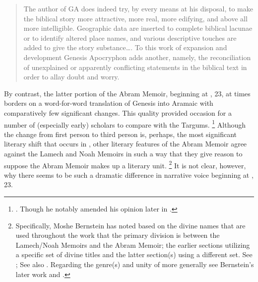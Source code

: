 \begin{quote}
    The author of GA does indeed try, by every means at his disposal, to make the biblical story more attractive, more real, more edifying, and above all more intelligible. Geographic data are inserted to complete biblical lacunae or to identify altered  place names, and various descriptive touches are added to give the story substance\dots. To this work of expansion and development Genesis Apocryphon adds another, namely, the reconciliation of unexplained or apparently conflicting statements in the biblical text in order to allay doubt and worry.\autocite[125]{vermes1961}
\end{quote}
\noindent
By contrast, the latter portion of the Abram Memoir, beginning at , 23, at times borders on a word-for-word translation of Genesis into Aramaic with comparatively few significant changes. This quality provided occasion for a number of (especially early) scholars to compare \ga with the Targums.%
    \footnote{\Cite[193]{black1983}. Though he notably amended his opinion later in \cite*{black_black-fohrer1968}.}
Although the change from first person to third person is, perhaps, the most significant literary shift that occurs in \ga, other literary features of the Abram Memoir agree against the Lamech and Noah Memoirs in such a way that they give reason to suppose the Abram Memoir makes up a literary unit.%
    \footnote{Specifically, Moshe Bernstein has noted based on the divine names that are used throughout the work that the primary division is between the Lamech/Noah Memoirs and the Abram Memoir; the earlier sections utilizing a specific set of divine titles and the latter section(s) using a different set. See \cite{bernstein_jbl2009}; See also \cite[97]{falk2007}. Regarding the genre(s) and unity of \ga more generally see Bernstein's later work \cite*{bernstein_berthelot-etal2010} and \cite*{bernstein_as2010}.}
It is not clear, however, why there seems to be such a dramatic difference in narrative voice beginning at , 23.

